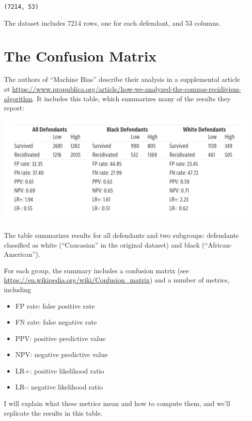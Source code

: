 \begin{lstlisting}[]
(7214, 53)
\end{lstlisting}

The dataset includes 7214 rows, one for each defendant, and 53 columns.

\hypertarget{the-confusion-matrix}{%
\section{The Confusion Matrix}\label{the-confusion-matrix}}

The authors of ``Machine Bias'' describe their analysis in a
supplemental article at
\url{https://www.propublica.org/article/how-we-analyzed-the-compas-recidivism-algorithm}.
It includes this table, which summarizes many of the results they
report:

\includegraphics{figs/machine_bias_table.png}

The table summarizes results for all defendants and two subgroups:
defendants classified as white (``Caucasian'' in the original dataset)
and black (``African-American'').

For each group, the summary includes a confusion matrix (see
\url{https://en.wikipedia.org/wiki/Confusion_matrix}) and a number of
metrics, including

\begin{itemize}
\tightlist
\item
  FP rate: false positive rate
\item
  FN rate: false negative rate
\item
  PPV: positive predictive value
\item
  NPV: negative predictive value
\item
  LR+: positive likelihood ratio
\item
  LR-: negative likelihood ratio
\end{itemize}

I will explain what these metrics mean and how to compute them, and
we'll replicate the results in this table.

